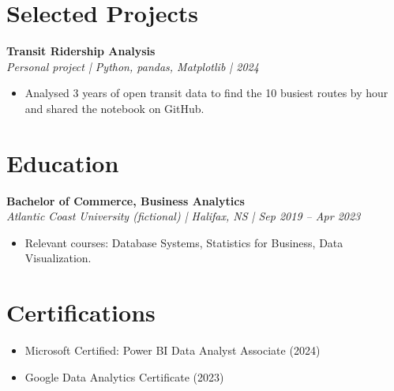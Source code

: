 \documentclass[11pt,letterpaper]{article}
\newcommand{\entry}[2]{\textbf{#1}\\\textit{#2}\par}
\begin{document}
\section{Selected Projects}
\entry{Transit Ridership Analysis}{Personal project | Python, pandas, Matplotlib | 2024}
\begin{itemize}
  \item Analysed 3 years of open transit data to find the 10 busiest routes by hour and shared the notebook on GitHub.
\end{itemize}

\section{Education}
\entry{Bachelor of Commerce, Business Analytics}{Atlantic Coast University (fictional) | Halifax, NS | Sep 2019 -- Apr 2023}
\begin{itemize}
  \item Relevant courses: Database Systems, Statistics for Business, Data Visualization.
\end{itemize}

\section{Certifications}
\begin{itemize}
  \item Microsoft Certified: Power BI Data Analyst Associate (2024)
  \item Google Data Analytics Certificate (2023)
\end{itemize}
\end{document}
